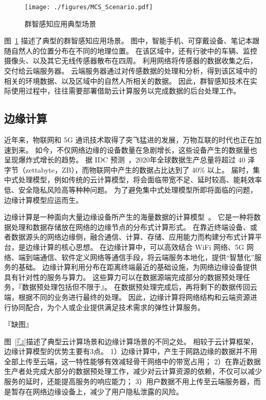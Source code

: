 \begin{figure}[h]
\centering
\texttt{[image: ./figures/MCS\_Scenario.pdf]}
\vspace{-0.5em}
\caption{群智感知应用典型场景}
\vspace{-1em}
\label{Figure_MCS}
\end{figure}

图~\ref{Figure_MCS} 描述了典型的群智感知应用场景。
图中，智能手机、可穿戴设备、笔记本跟随自然人的位置分布在不同的地理位置。
在该区域中，还有行驶中的车辆、监控摄像头、以及其它无线传感器散布在四周。
利用网络将传感器的数据收集之后，交付给云端服务器。
云端服务器通过对传感数据的处理和分析，得到该区域中的相关的环境数据、以及区域中的自然人所相关的数据。
因此，群智感知技术在实际使用过程中，往往需要部署借助云计算服务以完成数据的后台处理工作。

\subsection{边缘计算}

近年来，物联网和 5G 通讯技术取得了突飞猛进的发展，万物互联的时代也正在加速到来。
如今，不仅网络边缘的设备数量在急剧增长，这些设备产生的数据量也呈现爆炸式增长的趋势。
据 IDC 预测~\cite{zh_cn:shi}，2020年全球数据生产总量将超过 40 泽字节（zettabyte，ZB），而物联网中产生的数据占比达到了 40\% 以上。
届时，集中式处理模型，例如传统的云计算模型，将会面临带宽不足、延时较高、能耗效率低、安全隐私风险高等种种问题。
为了避免集中式处理模型所即将面临的问题，边缘计算模型应运而生。

边缘计算是一种面向大量边缘设备所产生的海量数据的计算模型~\cite{DBLP:journals/cm/SunA16}。
它是一种将数据处理和数据存储放在网络的边缘节点的分布式计算形式。
在靠近终端设备、或者数据源头的网络边缘侧，融合通信、计算、存储、应用能力而构建分布式计算平台，是边缘计算的核心思想。
在边缘计算中，可以高效结合 WiFi 网络、5G 网络、端到端通信、软件定义网络等通信手段，将云端服务本地化，提供“智慧化”服务的基础。
边缘计算利用分布在距离终端最近的基础设施，为网络边缘设备提供具有针对性的服务与算力。
这些算力可以在数据源端完成部分的数据预处理任务，『数据预处理包括但不限于』。
在数据预处理完成后，再将剩下的数据传回云端，根据不同的业务进行最终的处理。
因此，边缘计算将网络结构和云端资源进行协同配合，为个人或企业提供满足技术需求的弹性计算服务。

『缺图』

图~\ref{『』}描述了典型云计算场景和边缘计算场景的不同之处。
相较于云计算框架，边缘计算模型的优势主要有3点。
1）边缘计算中，产生于网路边缘的数据并不用全部上传至云端，这一特性能够有效减轻骨干网络中的带宽占用；
2）在靠近数据生产者处完成大部分的数据预处理工作，减少对云计算资源的依赖，不仅可以减少服务的延时，还能提高服务的响应能力；
3）用户数据不用上传至云端服务器，而是暂存在网络边缘设备上，减少了用户隐私泄露的风险。

